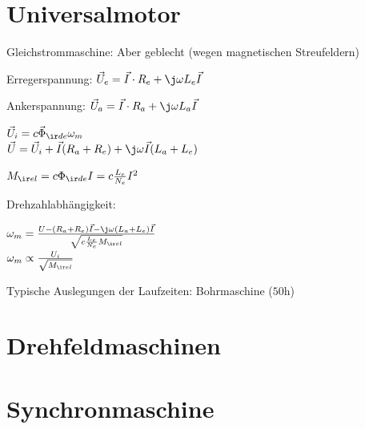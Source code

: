 \documentclass[fs, german]{latex4ei_fs}
\begin{document}
\section{Universalmotor}

\begin{sectionbox}
Gleichstrommaschine: Aber geblecht (wegen magnetischen Streufeldern)


Erregerspannung: $\vec U_e = \vec I \cdot R_e + \j \omega L_e \vec I$

Ankerspannung: $\vec U_a = \vec I \cdot R_a + \j \omega L_a \vec I$

$\vec U_i = c \vec \Phi_{\ir de} \omega_m$ \\


$\vec U = \vec U_i + \vec I (R_a + R_e) + \j \omega \vec I (L_a + L_e)$

$M_{\ir el} = c \Phi_{\ir de} I = c \frac{L_e}{N_e} I^2$

Drehzahlabhängigkeit:

$\omega_m = \frac{U- (R_a + R_e) \vec I - \j \omega (L_a + L_e) \vec I}{\sqrt{c \frac{L_e}{N_e}M_{\ir el}}}$ \\
$\omega_m \propto \frac{U_i}{\sqrt{M_{\ir el}}}$

Typische Auslegungen der Laufzeiten: Bohrmaschine ($50 \si{\hour}$)
\end{sectionbox}
\section{Drehfeldmaschinen}


\section{Synchronmaschine}
\end{document}
